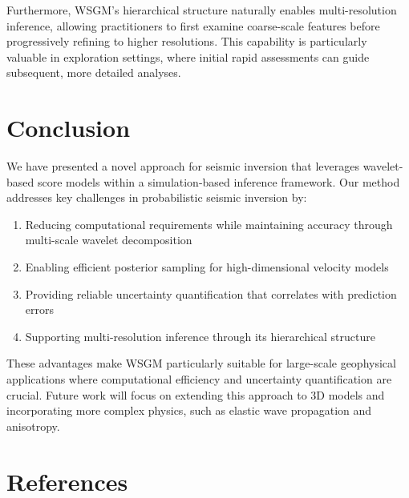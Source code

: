 \documentclass{IMAGE2025}
\begin{document}
Furthermore, WSGM's hierarchical structure naturally enables
multi-resolution inference, allowing practitioners to first examine
coarse-scale features before progressively refining to higher
resolutions. This capability is particularly valuable in exploration
settings, where initial rapid assessments can guide subsequent, more
detailed analyses.

\section{Conclusion}\label{conclusion}

We have presented a novel approach for seismic inversion that leverages
wavelet-based score models within a simulation-based inference
framework. Our method addresses key challenges in probabilistic seismic
inversion by:

\begin{enumerate}
\def\labelenumi{\arabic{enumi}.}
\tightlist
\item
  Reducing computational requirements while maintaining accuracy through
  multi-scale wavelet decomposition
\item
  Enabling efficient posterior sampling for high-dimensional velocity
  models
\item
  Providing reliable uncertainty quantification that correlates with
  prediction errors
\item
  Supporting multi-resolution inference through its hierarchical
  structure
\end{enumerate}

These advantages make WSGM particularly suitable for large-scale
geophysical applications where computational efficiency and uncertainty
quantification are crucial. Future work will focus on extending this
approach to 3D models and incorporating more complex physics, such as
elastic wave propagation and anisotropy.

\section{References}\label{references}
\end{document}
